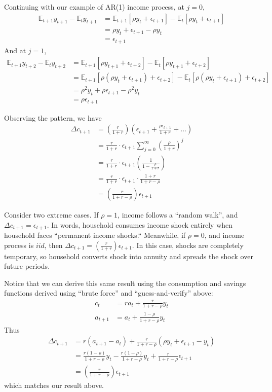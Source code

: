 \documentclass[11pt]{article}
\newcommand{\expectation}{\mathbb{E}}
\begin{document}
Continuing with our example of AR(1) income process, at $j=0$, 
\begin{align*}
    \expectation_{t+1} y_{t+1} - \expectation_t y_{t+1} &= \expectation_{t+1} [\rho y_t + \epsilon_{t+1}] - \expectation_t [\rho y_t + \epsilon_{t+1}] \\
    &= \rho y_t + \epsilon_{t+1} - \rho y_t \\
    &= \epsilon_{t+1} 
\end{align*}
And at $j=1$, 
\begin{align*}
    \expectation_{t+1} y_{t+2} - \expectation_t y_{t+2} &= \expectation_{t+1} [\rho y_{t+1} + \epsilon_{t+2}] - \expectation_t [\rho y_{t+1} + \epsilon_{t+2}] \\
    &= \expectation_{t+1} [\rho (\rho y_t + \epsilon_{t+1}) + \epsilon_{t+2}] - \expectation_t [\rho (\rho y_t + \epsilon_{t+1}) + \epsilon_{t+2}] \\
    &= \rho^2 y_t + \rho \epsilon_{t+1} - \rho^2 y_t \\
    &= \rho \epsilon_{t+1}
\end{align*}

Observing the pattern, we have 
\begin{align*}
    \Delta c_{t+1} &= \left(\frac{r}{1+r}\right) \left(\epsilon_{t+1} + \frac{\rho \epsilon_{t+1}}{1+r} + \dots \right) \\
    &= \frac{r}{1+r} \cdot \epsilon_{t+1} \sum_{j=0}^\infty \left(\frac{\rho}{1+r}\right)^j \\ 
    &= \frac{r}{1+r} \cdot \epsilon_{t+1} \left( \frac{1}{1 - \frac{\rho}{1+r}}\right) \\ 
    &= \frac{r}{1+r} \cdot \epsilon_{t+1} \cdot \frac{1+r}{1+r-\rho} \\
    &= \left(\frac{r}{1+r-\rho}\right) \epsilon_{t+1}
\end{align*}

Consider two extreme cases. If $\rho=1$, income follows a ``random walk'', and $\Delta c_{t+1} = \epsilon_{t+1}$. In words, household consumes income shock entirely when household faces ``permanent income shocks.`` Meanwhile, if $\rho=0$, and income process is $iid$, then $\Delta c_{t+1} = \left(\frac{r}{1+r}\right) \epsilon_{t+1}$. In this case, shocks are completely temporary, so household converts shock into annuity and spreads the shock over future periods.

Notice that we can derive this same result using the consumption and savings functions derived using ``brute force'' and ``guess-and-verify'' above:
\begin{align*}
    c_t &= r a_t + \frac{r}{1+r-\rho} y_t \\
    a_{t+1} &= a_t + \frac{1-\rho}{1+r-\rho}y_t
\end{align*}
Thus
\begin{align*}
    \Delta c_{t+1} &= r(a_{t+1} - a_t) + \frac{r}{1+r-\rho}\left(\rho y_t + \epsilon_{t+1} - y_t \right) \\
                   &= \frac{r(1-\rho)}{1+r-\rho}y_t - \frac{r(1-\rho)}{1+r-\rho}y_t + \frac{r}{1+r-\rho}\epsilon_{t+1} \\
                   &= \left(\frac{r}{1+r-\rho}\right)\epsilon_{t+1}
\end{align*}
which matches our result above. 
\end{document}
